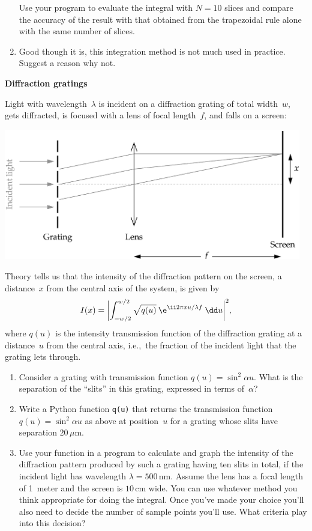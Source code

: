 \documentclass[12pt]{article}
\begin{document}
\begin{exercises}
\begin{enumerate}
  Use your program to evaluate the integral with $N=10$ slices and compare
  the accuracy of the result with that obtained from the trapezoidal rule
  alone with the same number of slices.
\item Good though it is, this integration method is not much used in
  practice.  Suggest a reason why not.
\end{enumerate}



\exercise \textbf{Diffraction gratings}

\exskip Light with wavelength~$\lambda$ is incident on a diffraction
grating of total width~$w$, gets diffracted, is focused with a lens of
focal length~$f$, and falls on a screen:
\begin{center}
\includegraphics[width=13cm]{diffraction.eps}
\end{center}
\medskip
Theory tells us that the intensity of the diffraction pattern on the
screen, a distance~$x$ from the central axis of the system, is given by
\begin{displaymath}
I(x) = \biggl| \int_{-w/2}^{w/2} \sqrt{q(u)}\>
               \e^{\ii 2\pi xu/\lambda f} \>\dd u \biggr|^2,
\end{displaymath}
where $q(u)$ is the intensity transmission function of the diffraction
grating at a distance~$u$ from the central axis, i.e.,~the fraction of the
incident light that the grating lets through.
\begin{enumerate}\setlength{\itemsep}{0pt}
\item Consider a grating with transmission function $q(u) = \sin^2 \alpha
  u$.  What is the separation of the ``slits'' in this grating, expressed
  in terms of~$\alpha$?
\item Write a Python function \verb|q(u)| that returns the transmission
  function $q(u) = \sin^2 \alpha u$ as above at position~$u$ for a grating
  whose slits have separation $20\,\mu$m.
\item Use your function in a program to calculate and graph the intensity
  of the diffraction pattern produced by such a grating having ten slits in
  total, if the incident light has wavelength $\lambda=500\,$nm.  Assume
  the lens has a focal length of 1~meter and the screen is $10\,$cm wide.
  You can use whatever method you think appropriate for doing the integral.
  Once you've made your choice you'll also need to decide the number of
  sample points you'll use.  What criteria play into this decision?


\end{enumerate}
\end{exercises}
\end{document}
